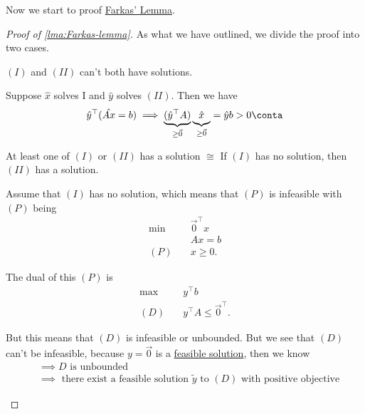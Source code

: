 Now we start to proof \hyperref[lma:Farkas-lemma]{Farkas' Lemma}.
\begin{proof}[Proof of \autoref{lma:Farkas-lemma}]
	As what we have outlined, we divide the proof into two cases.
	\begin{claim}
		\((I)\) and \((II)\) can't both have solutions.
	\end{claim}
	\begin{explanation}
		Suppose \(\hat{x}\) solves I and \(\hat{y}\) solves \((II)\). Then we have
		\[
			\hat{y}^{\top}(\hat{Ax} = b) \implies \underbrace{(\hat{y}^{\top} A)}_{\geq  \vec{0}}\underbrace{\vphantom{\hat{y}^{\top}}\hat{x}}_{\geq  \vec{0}} = \hat{y} b > 0\conta
		\]
	\end{explanation}
	\begin{claim}
		At least one of \((I)\) or \((II)\) has a solution \(\cong\) If \((I)\) has no solution, then \((II)\) has a solution.
	\end{claim}
	\begin{explanation}
		Assume that \((I)\) has no solution, which means that \((P)\) is infeasible with \((P)\) being
		\[
			\begin{aligned}
				\min~    & \vec{0}^{\top} x \\
				         & Ax = b           \\
				(P)\quad & x\geq 0.
			\end{aligned}
		\]

		The dual of this \((P)\) is
		\[
			\begin{aligned}
				\max~    & y^{\top}b                       \\
				(D)\quad & y^{\top} A \leq \vec{0}^{\top}.
			\end{aligned}
		\]

		But this means that \((D)\) is infeasible or unbounded. But we see that \((D)\) can't be infeasible, because \(y = \vec{0}\) is a
		\hyperref[def:feasible-solution]{feasible solution}, then we know
		\[
			\begin{split}
				&\implies D \text{ is unbounded} \\
				&\implies \text{ there exist a feasible solution \(\widetilde{y}\) to \((D)\) with positive objective}
			\end{split}
		\]
	\end{explanation}
\end{proof}

